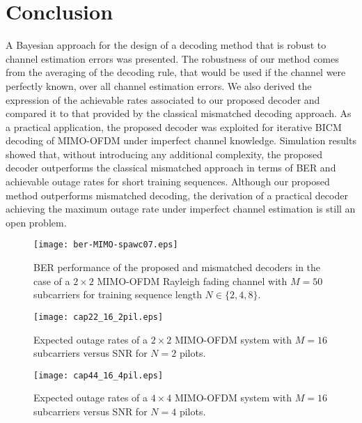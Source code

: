 \documentclass{article}
\begin{document}
\section{Conclusion}
\label{sec:concl}
A Bayesian approach for the design of a decoding method that is robust to channel estimation errors was presented.
The robustness of our method comes from the averaging of the decoding rule, that would be used if the channel were perfectly known, over all channel estimation errors.
We also derived the expression of the achievable rates associated to our proposed decoder and compared it to that provided by the classical mismatched decoding approach. As a practical application, the proposed decoder was exploited for iterative BICM decoding of MIMO-OFDM under imperfect channel knowledge.
Simulation results showed that, without introducing any additional complexity, the proposed decoder outperforms the classical mismatched approach in terms of BER and achievable outage rates for short training sequences.
Although our proposed method outperforms mismatched decoding, the derivation of a practical decoder achieving the maximum outage rate under imperfect channel estimation is still an open problem.
\vspace{-1.5mm}


\begin{figure}[!htb]
\vspace{-3mm}
\centering
\texttt{[image: ber-MIMO-spawc07.eps]}
\caption{BER performance of the proposed and mismatched decoders in the case of a $2\times2$ MIMO-OFDM Rayleigh fading channel with $M=50$ subcarriers for training sequence length $N\in\{2, 4, 8\}$.} \label{bermimofdm} \vspace{-4mm}
\end{figure}
\begin{figure}[!htb]
\vspace{2mm}
\centering
\texttt{[image: cap22\_16\_2pil.eps]}
\caption{Expected outage rates of a $2\times2$ MIMO-OFDM system with $M=16$ subcarriers versus SNR for $N=2$ pilots.}\label{capmimofdm22}\vspace{-4mm}
\end{figure}
\begin{figure}[!htb]
\vspace{2mm}
\centering
\texttt{[image: cap44\_16\_4pil.eps]}
\caption{Expected outage rates of a $4\times4$ MIMO-OFDM system with $M=16$ subcarriers versus SNR for $N=4$ pilots.}\label{capmimofdm44}\vspace{-4mm}
\end{figure}
\end{document}
